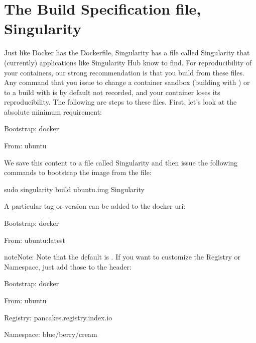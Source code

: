 \documentclass[letterpaper,10pt,english]{sphinxmanual}
\begin{document}
\section{The Build Specification file, Singularity}
\label{\detokenize{singularity_and_docker:the-build-specification-file-singularity}}
Just like Docker has the Dockerfile, Singularity has a file called
Singularity that (currently) applications like Singularity Hub know to
find. For reproducibility of your containers, our strong
recommendation is that you build from these files. Any command that you
issue to change a container sandbox (building with  ) or to a build with 
is by default not recorded, and your container loses its
reproducibility. The following are steps to these files. First,
let’s look at the absolute minimum requirement:

%
\begin{sphinxVerbatim}[commandchars=\\\{\}]
Bootstrap: docker

From: ubuntu
\end{sphinxVerbatim}

We save this content to a file called Singularity and then issue
the following commands to bootstrap the image from the file:

%
\begin{sphinxVerbatim}[commandchars=\\\{\}]
sudo singularity build ubuntu.img Singularity
\end{sphinxVerbatim}

A particular tag or version can be added to the docker uri:

%
\begin{sphinxVerbatim}[commandchars=\\\{\}]
Bootstrap: docker

From: ubuntu:latest
\end{sphinxVerbatim}

\begin{sphinxadmonition}{note}{Note:}
Note that the default is  . If you want to customize the Registry or
Namespace, just add those to the header:
\end{sphinxadmonition}

%
\begin{sphinxVerbatim}[commandchars=\\\{\}]
Bootstrap: docker

From: ubuntu

Registry: pancakes.registry.index.io

Namespace: blue/berry/cream
\end{sphinxVerbatim}
\end{document}
